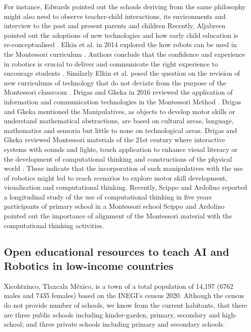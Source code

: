 \documentclass[conference]{IEEEtran}
\begin{document}
For instance, Edwards pointed out the schools deriving from the same philosophy might also need to observe teacher-child interactions, its environments and interview to the past and present parents and children \cite{edwards2002}
Recently, Aljabreen pointed out the adoptions of new technologies and how early child education is re-conceptualised \cite{Aljabreen2020}. 
Elkin et al. in 2014 explored the how robots can be used in the Montessori curriculum \cite{elkin2014}.
Authors conclude that the confidence and experience in robotics is crucial to deliver and communicate the right experience to encourage students \cite{elkin2014}.
Similarly Elkin et al. posed the question on the revision of new curriculums of technology that do not deviate from the purpose of the Montessori classroom \cite{elkin2014}.
Drigas and Gkeka in 2016 reviewed the application of information and communication technologies in the Montessori Method \cite{DrigasGkeka2016}.
Drigas and Gkeka mentioned the Manipulatives, as objects to develop motor skills or understand mathematical abstractions, are based on cultural areas, language, mathematics and sensoria but little to none on technological areas.
Drigas and Gkeka reviewed Montessori materials of the 21st century where interactive systems with sounds and lights, touch application to enhance visual literacy or the development of computational thinking and constructions of the physical world \cite{DrigasGkeka2016}.
These indicate that the incorporation of such manipulatives with the use of robotics might led to reach scenarios to explore motor skill development, visualisation and computational thinking. 
Recently, Scippo and Ardolino reported a longitudinal study of the use of computational thinking in five years participants of primary school in a Montessori school \cite{ScippoArdolino2021}
Scippo and Ardolino pointed out the importance of alignment of the Montessori material with the computational thinking activities. 

\subsection{Open educational resources to teach AI and Robotics in low-income countries}
Xicohtzinco, Tlaxcala M\'exico, is a town of a total population of 14,197 (6762 males and 7435 females) based on the INEGI's census 2020.
Although the census do not provide number of schools, we know from the current habitants, that there are three public schools including kinder-garden, primary, secondary and high-school; and three private schools including primary and secondary schools. 
\end{document}
